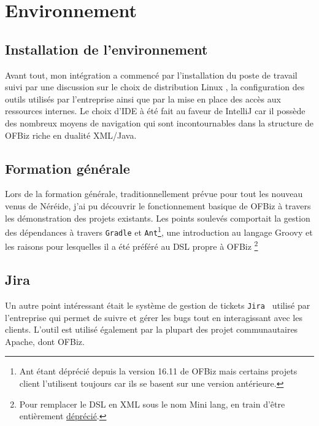 \newpage









\section{Environnement}

\subsection{Installation de l'environnement}
Avant tout, mon intégration a commencé par l'installation du poste de travail suivi par une discussion sur le choix de distribution Linux , la configuration des outils utilisés par l'entreprise ainsi que par la mise en place des accès aux ressources internes. Le choix d'IDE à été fait au faveur de IntelliJ car il possède des nombreux moyens de navigation qui sont incontournables dans la structure de OFBiz riche en dualité XML/Java. 




\subsection{Formation générale}


Lors de la formation générale, traditionnellement prévue pour tout les nouveau venus de Néréide, j'ai pu découvrir le fonctionnement basique de OFBiz à travers les démonstration des projets existants. Les points soulevés comportait la gestion des dépendances à travers \verb|Gradle| et \verb|Ant|\footnote{Ant étant déprécié depuis la version 16.11 de OFBiz mais certains projets client l'utilisent toujours car ils se basent sur une version antérieure.  }, une introduction au langage Groovy et les raisons pour lesquelles il a été préféré au DSL propre à OFBiz \footnote{Pour remplacer le DSL en XML  sous le nom Mini lang, en train d'être entièrement \href{https://cwiki.apache.org/confluence/display/OFBIZ/Mini+Lang+Deprecation}{déprécié}. }


\subsection{Jira}
Un autre point intéressant était le système de gestion de tickets \verb|Jira | utilisé par l'entreprise qui permet de suivre et gérer les bugs tout en interagissant avec les clients. L'outil est utilisé également par la plupart des projet communautaires Apache, dont OFBiz.

